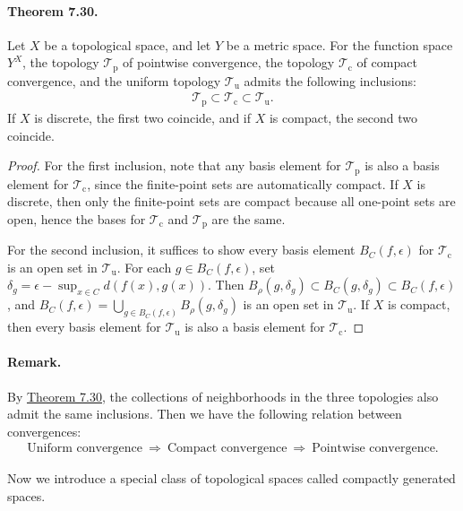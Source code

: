 \documentclass{article}
\numberwithin{equation}{section}
\theoremstyle{plain}
\theoremstyle{definition}
\begin{document}
\paragraph{Theorem 7.30.\label{thm:7.30}} Let $X$ be a topological space, and let $Y$ be a metric space. For the function space $Y^X$, the topology $\mathscr{T}_\mathrm{p}$ of pointwise convergence, the topology $\mathscr{T}_\mathrm{c}$ of compact convergence, and the uniform topology $\mathscr{T}_\mathrm{u}$ admits the following inclusions:
\begin{align*}
	\mathscr{T}_\mathrm{p}\subset \mathscr{T}_\mathrm{c} \subset \mathscr{T}_\mathrm{u}.
\end{align*}
If $X$ is discrete, the first two coincide, and if $X$ is compact, the second two coincide.
\begin{proof}
For the first inclusion, note that any basis element for $\mathscr{T}_\mathrm{p}$ is also a basis element for $\mathscr{T}_\mathrm{c}$, since the finite-point sets are automatically compact. If $X$ is discrete, then only the finite-point sets are compact because all one-point sets are open, hence the bases for $\mathscr{T}_\mathrm{c}$ and $\mathscr{T}_\mathrm{p}$ are the same.

For the second inclusion, it suffices to show every basis element $B_C(f,\epsilon)$ for $\mathscr{T}_\mathrm{c}$ is an open set in $\mathscr{T}_\mathrm{u}$. For each $g\in B_C(f,\epsilon)$, set $\delta_g=\epsilon - \sup_{x\in C}d(f(x),g(x))$. Then $B_\rho(g,\delta_g)\subset B_C(g,\delta_g)\subset B_C(f,\epsilon)$, and $B_C(f,\epsilon)=\bigcup_{g\in B_C(f,\epsilon)}B_\rho(g,\delta_g)$ is an open set in $\mathscr{T}_\mathrm{u}$. If $X$ is compact, then every basis element for $\mathscr{T}_\mathrm{u}$ is also a basis element for $\mathscr{T}_\mathrm{c}$.
\end{proof}

\paragraph{Remark.} By \hyperref[thm:7.30]{Theorem 7.30}, the collections of neighborhoods in the three topologies also admit the same inclusions. Then we have the following relation between convergences:
\begin{align*}
	\text{Uniform convergence}\ \Rightarrow\ \text{Compact convergence}\ \Rightarrow\ \text{Pointwise convergence}.
\end{align*}

Now we introduce a special class of topological spaces called compactly generated spaces.
\end{document}

